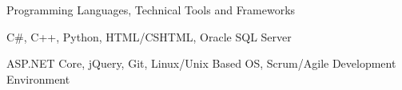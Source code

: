 \begin{cventries}
  \cventry
    {Programming Languages, Technical Tools and Frameworks}
    {}
    {}
    {}
    {
      \begin{cvitems}
        \item {C\#, C++, Python, HTML/CSHTML, Oracle SQL Server}
        \item {ASP.NET Core, jQuery, Git, Linux/Unix Based OS, Scrum/Agile Development Environment}
      \end{cvitems}
    }

\end{cventries}
